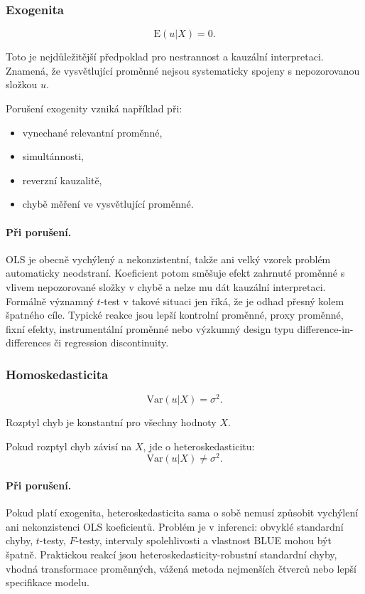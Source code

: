 \subsubsection{Exogenita}

\[
\mathrm{E}(u|X)=0.
\]

Toto je nejdůležitější předpoklad pro nestrannost a kauzální interpretaci. Znamená, že vysvětlující proměnné
nejsou systematicky spojeny s nepozorovanou složkou $u$.

Porušení exogenity vzniká například při:
\begin{itemize}
    \item vynechané relevantní proměnné,
    \item simultánnosti,
    \item reverzní kauzalitě,
    \item chybě měření ve vysvětlující proměnné.
\end{itemize}

\paragraph{Při porušení.}
OLS je obecně vychýlený a nekonzistentní, takže ani velký vzorek problém automaticky neodstraní.
Koeficient potom směšuje efekt zahrnuté proměnné s vlivem nepozorované složky v chybě a nelze mu dát
kauzální interpretaci. Formálně významný \(t\)-test v takové situaci jen říká, že je odhad přesný kolem
špatného cíle. Typické reakce jsou lepší kontrolní proměnné, proxy proměnné, fixní efekty, instrumentální
proměnné nebo výzkumný design typu difference-in-differences či regression discontinuity.

\subsubsection{Homoskedasticita}

\[
\mathrm{Var}(u|X)=\sigma^2.
\]

Rozptyl chyb je konstantní pro všechny hodnoty $X$.

Pokud rozptyl chyb závisí na $X$, jde o heteroskedasticitu:
\[
\mathrm{Var}(u|X)\neq\sigma^2.
\]

\paragraph{Při porušení.}
Pokud platí exogenita, heteroskedasticita sama o sobě nemusí způsobit vychýlení ani nekonzistenci OLS
koeficientů. Problém je v inferenci: obvyklé standardní chyby, \(t\)-testy, \(F\)-testy, intervaly
spolehlivosti a vlastnost BLUE mohou být špatně. Praktickou reakcí jsou heteroskedasticity-robustní
standardní chyby, vhodná transformace proměnných, vážená metoda nejmenších čtverců nebo lepší
specifikace modelu.

